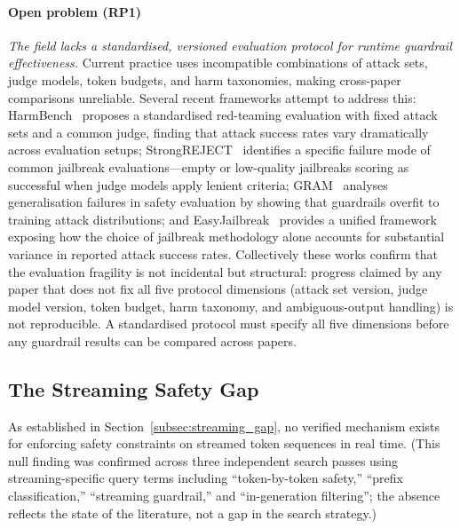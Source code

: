 \paragraph{Open problem (RP1)}
\textit{The field lacks a standardised, versioned evaluation protocol for runtime
guardrail effectiveness.}
Current practice uses incompatible combinations of attack sets, judge models,
token budgets, and harm taxonomies, making cross-paper comparisons unreliable.
Several recent frameworks attempt to address this: HarmBench~\cite{mazeika2024harmbench}
proposes a standardised red-teaming evaluation with fixed attack sets and a common
judge, finding that attack success rates vary dramatically across evaluation setups;
StrongREJECT~\cite{souly2024strongreject} identifies a specific failure mode of
common jailbreak evaluations---empty or low-quality jailbreaks scoring as successful
when judge models apply lenient criteria; GRAM~\cite{zhu2024gram} analyses
generalisation failures in safety evaluation by showing that guardrails overfit to
training attack distributions; and EasyJailbreak~\cite{zhou2024easyjailbreak} provides
a unified framework exposing how the choice of jailbreak methodology alone accounts
for substantial variance in reported attack success rates.
Collectively these works confirm that the evaluation fragility is not incidental but
structural: progress claimed by any paper that does not fix all five protocol
dimensions (attack set version, judge model version, token budget, harm taxonomy,
and ambiguous-output handling) is not reproducible.
A standardised protocol must specify all five dimensions before any guardrail results
can be compared across papers.

\subsection{The Streaming Safety Gap}

As established in Section~\ref{subsec:streaming_gap}, no verified mechanism exists
for enforcing safety constraints on streamed token sequences in real time.
(This null finding was confirmed across three independent search passes using streaming-specific query terms including ``token-by-token safety,'' ``prefix classification,'' ``streaming guardrail,'' and ``in-generation filtering''; the absence reflects the state of the literature, not a gap in the search strategy.)

